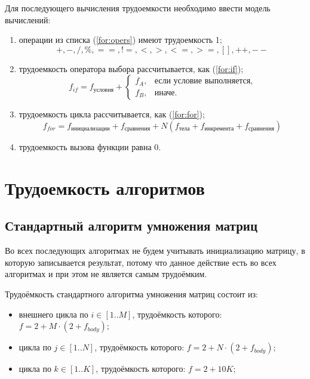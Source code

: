Для последующего вычисления трудоемкости необходимо ввести модель вычислений:
\begin{enumerate}
    \item операции из списка (\ref{for:opers}) имеют трудоемкость 1;
        \begin{equation}
            \label{for:opers}
            +, -, /, \%, ==, !=, <, >, <=, >=, [], ++, {-}-
        \end{equation}
    \item трудоемкость оператора выбора  рассчитывается, как (\ref{for:if});
	\begin{equation}
        \label{for:if}
        f_{if} = f_{\text{условия}} +
        \begin{cases}
        f_A, & \text{если условие выполняется,}\\
        f_B, & \text{иначе.}
        \end{cases}
	\end{equation}
\item трудоемкость цикла рассчитывается, как (\ref{for:for});
    \begin{equation}
        \label{for:for}
        f_{for} = f_{\text{инициализации}} + f_{\text{сравнения}} + N(f_{\text{тела}} + f_{\text{инкремента}} + f_{\text{сравнения}})
    \end{equation}
	\item трудоемкость вызова функции равна 0.
\end{enumerate}

\section{Трудоемкость алгоритмов}

\subsection{Стандартный алгоритм умножения матриц}

Во всех последующих алгоритмах не будем учитывать инициализацию матрицу, в которую записывается результат, потому что данное действие есть во всех алгоритмах и при этом не является самым трудоёмким.

Трудоёмкость стандартного алгоритма умножения матриц состоит из:
\begin{itemize}
    \item внешнего цикла по $i \in [1..M]$, трудоёмкость которого: $f = 2 + M \cdot (2 + f_{body})$;
    \item цикла по $j \in [1..N]$, трудоёмкость которого: $f = 2 + N \cdot (2 + f_{body})$;
    \item цикла по $k \in [1..K]$, трудоёмкость которого: $f = 2 + 10K$;
\end{itemize}

